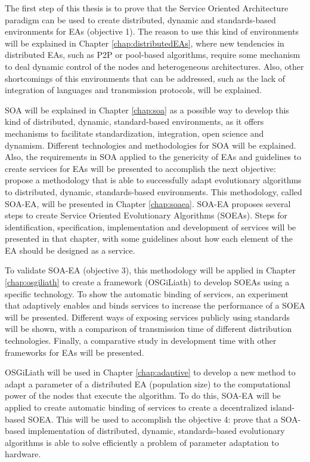 The first step of this thesis is to prove that the Service Oriented Architecture paradigm can be used to create distributed, dynamic and standards-based environments for EAs (objective 1). The reason to use this kind of environments will be explained in Chapter \ref{chap:distributedEAs}, where new tendencies in distributed EAs, such as P2P or pool-based algorithms, require some mechanism to deal dynamic control of the nodes and heterogeneous architectures. Also, other shortcomings of this environments that can be addressed, such as the lack of integration of languages and transmission protocols, will be explained.

 SOA will be explained in Chapter \ref{chap:soa} as a possible way to develop this kind of distributed, dynamic, standard-based environments, as it offers mechanisms to facilitate standardization, integration, open science and dynamism. Different technologies and methodologies for SOA will be explained. Also, the requirements in SOA applied to the genericity of EAs and guidelines to create services for EAs will be presented to accomplish the next objective: propose a methodology that is able to successfully adapt evolutionary algorithms to distributed, dynamic, standards-based environments. This methodology, called SOA-EA, will be presented in Chapter \ref{chap:soaea}. SOA-EA proposes several steps to create Service Oriented Evolutionary Algorithms (SOEAs). Steps for identification, specification, implementation and development of services will be presented in that chapter, with some guidelines about how each element of the EA should be designed as a service.

To validate SOA-EA (objective 3), this methodology will be applied in Chapter \ref{chap:osgiliath} to create a framework (OSGiLiath) to develop SOEAs using a
specific technology. %
To show the automatic binding of services, an experiment that
adaptively enables and binds services to increase the performance of a SOEA %
will be presented. Different ways of exposing services publicly using standards will be shown, with a comparison of transmission time of different distribution technologies. Finally, a comparative study in development time with other frameworks for EAs will be presented.

OSGiLiath will be used in Chapter \ref{chap:adaptive} to develop a new method to adapt a parameter of a distributed EA (population size) to the computational power of the nodes that execute the algorithm. To do this, SOA-EA will be applied to create automatic binding of services to create a decentralized island-based SOEA. This will be used to accomplish the objective 4: prove that a SOA-based implementation of distributed, dynamic, standards-based evolutionary algorithms is able to solve efficiently a problem of parameter adaptation to hardware.

